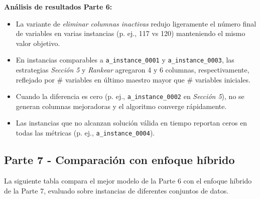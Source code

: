 \documentclass[a4paper,12pt]{article}
\begin{document}
\textbf{Análisis de resultados Parte 6:}
\begin{itemize}
    \item La variante de \emph{eliminar columnas inactivas} redujo ligeramente el número final de variables en varias instancias (p. ej., 117 vs 120) manteniendo el mismo valor objetivo.
    \item En instancias comparables a \texttt{a\_instance\_0001} y \texttt{a\_instance\_0003}, las estrategias \emph{Sección 5} y \emph{Rankear} agregaron 4 y 6 columnas, respectivamente, reflejado por \# variables en último maestro mayor que \# variables iniciales.
    \item Cuando la diferencia es cero (p. ej., \texttt{a\_instance\_0002} en \emph{Sección 5}), no se generan columnas mejoradoras y el algoritmo converge rápidamente.
    \item Las instancias que no alcanzan solución válida en tiempo reportan ceros en todas las métricas (p. ej., \texttt{a\_instance\_0004}).
\end{itemize}

\clearpage

\subsection{Parte 7 - Comparación con enfoque híbrido}

La siguiente tabla compara el mejor modelo de la Parte 6 con el enfoque híbrido de la Parte 7, evaluado sobre instancias de diferentes conjuntos de datos.
\end{document}
